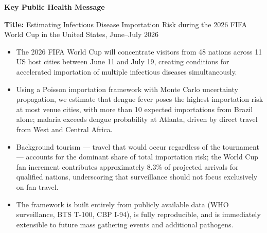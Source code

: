 \documentclass[12pt]{article}
\begin{document}
\thispagestyle{empty}

\begin{center}
{\large \textbf{Key Public Health Message}}
\end{center}

\vspace{0.5cm}

\textbf{Title:} Estimating Infectious Disease Importation Risk during the 2026 FIFA World Cup in the United States, June--July 2026

\vspace{0.5cm}

\begin{itemize}[leftmargin=*, itemsep=6pt]

  \item The 2026 FIFA World Cup will concentrate visitors from 48 nations across 11 US host cities between June 11 and July 19, creating conditions for accelerated importation of multiple infectious diseases simultaneously.

  \item Using a Poisson importation framework with Monte Carlo uncertainty propagation, we estimate that dengue fever poses the highest importation risk at most venue cities, with more than 10 expected importations from Brazil alone; malaria exceeds dengue probability at Atlanta, driven by direct travel from West and Central Africa.

  \item Background tourism — travel that would occur regardless of the tournament — accounts for the dominant share of total importation risk; the World Cup fan increment contributes approximately 8.3\% of projected arrivals for qualified nations, underscoring that surveillance should not focus exclusively on fan travel.

  \item The framework is built entirely from publicly available data (WHO surveillance, BTS T-100, CBP I-94), is fully reproducible, and is immediately extensible to future mass gathering events and additional pathogens.

\end{itemize}
\end{document}
